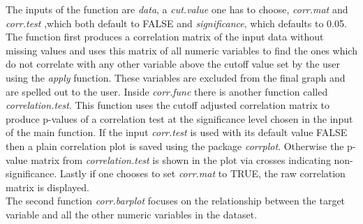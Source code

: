 The inputs of the function are \textit{data}, a \textit{cut.value} one has to choose, \textit{corr.mat} and \textit{corr.test} ,which both default to FALSE and \textit{significance}, which defaults to 0.05. The function first produces a correlation matrix of the input data without missing values and uses this matrix of all numeric variables to find the ones which do not correlate with any other variable above the cutoff value set by the user using the \textit{apply} function. These variables are excluded from the final graph and are spelled out to the user. Inside \textit{corr.func} there is another function called \textit{correlation.test}. This function uses the cutoff adjusted correlation matrix to produce p-values of a correlation test at the significance level chosen in the input of the main function. If the input \textit{corr.test} is used with its default value FALSE then a plain correlation plot is saved using the package \textit{corrplot}. Otherwise the p-value matrix from \textit{correlation.test} is shown in the plot via crosses indicating non-significance. Lastly if one chooses to set \textit{corr.mat} to TRUE, the raw correlation matrix is displayed. \\
The second function \textit{corr.barplot} focuses on the relationship between the target variable and all the other numeric variables in the dataset. 
